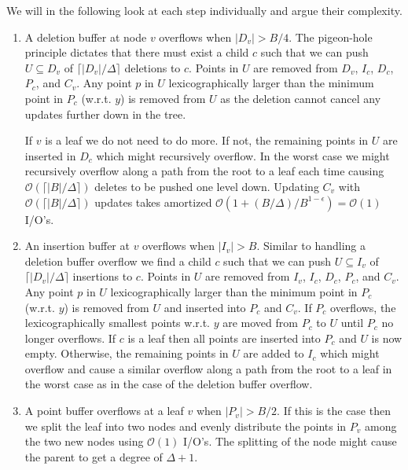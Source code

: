 \documentclass[twoside,11pt,openright]{report}
\begin{document}
We will in the following look at each step individually and argue their complexity.

\begin{enumerate}[label=(\roman*)]
	\item\label{update:del} A deletion buffer at node $v$ overflows when $\vert D_v \vert > B/4$. The pigeon-hole principle dictates that there must exist a child $c$ such that we can push $U \subseteq D_v$ of $\lceil \vert D_v \vert / \Delta \rceil$ deletions to $c$. Points in $U$ are removed from $D_v$, $I_c$, $D_c$, $P_c$, and $C_v$. Any point $p$ in $U$ lexicographically larger than the minimum point in $P_c$ (w.r.t. $y$) is removed from $U$ as the deletion cannot cancel any updates further down in the tree.
	
	If $v$ is a leaf we do not need to do more. If not, the remaining points in $U$ are inserted in $D_c$ which might recursively overflow. In the worst case we might recursively overflow along a path from the root to a leaf each time causing $\mathcal{O}(\lceil \vert B \vert / \Delta \rceil)$ deletes to be pushed one level down. Updating $C_v$ with $\mathcal{O}(\lceil \vert B \vert / \Delta \rceil)$ updates takes amortized $\mathcal{O}(1+ (B/\Delta) / B^{1-\epsilon}) = \mathcal{O}(1)$ I/O's.
	
	\item\label{update:ins} An insertion buffer at $v$ overflows when $\vert I_v \vert > B$. Similar to handling a deletion buffer overflow we find a child $c$ such that we can push $U \subseteq I_v$ of $\lceil \vert D_v \vert / \Delta \rceil$ insertions to $c$. Points in $U$ are removed from $I_v$, $I_c$, $D_c$, $P_c$, and $C_v$.
	Any point $p$ in $U$ lexicographically larger than the minimum point in $P_c$ (w.r.t. $y$) is removed from $U$ and inserted into $P_c$ and $C_v$.
	If $P_c$ overflows, the lexicographically smallest points w.r.t. $y$ are moved from $P_c$ to $U$ until $P_c$ no longer overflows.
	If $c$ is a leaf then all points are inserted into $P_c$ and $U$ is now empty.
	Otherwise, the remaining points in $U$ are added to $I_c$ which might overflow and cause a similar overflow along a path from the root to a leaf in the worst case as in the case of the deletion buffer overflow.
	
	\item\label{update:pbo} A point buffer overflows at a leaf $v$ when $\vert P_v \vert > B/2$. If this is the case then we split the leaf into two nodes and evenly distribute the points in $P_v$ among the two new nodes using $\mathcal{O}(1)$ I/O's. The splitting of the node might cause the parent to get a degree of $\Delta+1$.
	

\end{enumerate}
\end{document}
